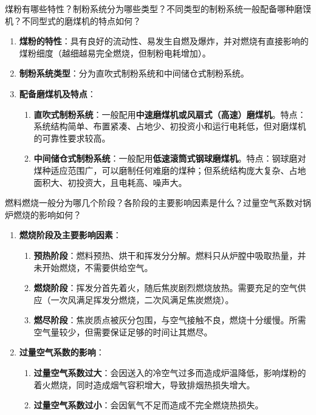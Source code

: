 \begin{problem}
煤粉有哪些特性？制粉系统分为哪些类型？不同类型的制粉系统一般配备哪种磨馍机？不同型式的磨煤机的特点如何？
\end{problem}

\begin{solution}
\begin{enumerate}
  \item \textbf{煤粉的特性}：具有良好的流动性、易发生自燃及爆炸，并对燃烧有直接影响的煤粉细度（越细越易完全燃烧，但制粉电耗增加）。
  \item \textbf{制粉系统类型}：分为直吹式制粉系统和中间储仓式制粉系统。
  \item \textbf{配备磨煤机及特点}：
  \begin{enumerate}
    \item \textbf{直吹式制粉系统}：一般配用\textbf{中速磨煤机或风扇式（高速）磨煤机}。特点：系统结构简单、布置紧凑、占地少、初投资小和运行电耗低，但对磨煤机的可靠性要求较高。
    \item \textbf{中间储仓式制粉系统}：一般配用\textbf{低速滚筒式钢球磨煤机}。特点：钢球磨对煤种适应范围广，可以磨制任何难磨的煤种；但系统结构庞大复杂、占地面积大、初投资大，且电耗高、噪声大。
  \end{enumerate}
\end{enumerate}
\end{solution}

\begin{problem}
燃料燃烧一般分为哪几个阶段？各阶段的主要影响因素是什么？过量空气系数对锅炉燃烧的影响如何？
\end{problem}

\begin{solution}
\begin{enumerate}
  \item \textbf{燃烧阶段及主要影响因素}：
  \begin{enumerate}
    \item \textbf{预热阶段}：燃料预热、烘干和挥发分分解。燃料只从炉膛中吸取热量，并未开始燃烧，不需要供给空气。
    \item \textbf{燃烧阶段}：挥发分首先着火，随后焦炭剧烈燃烧放热。需要充足的空气供应（一次风满足挥发分燃烧，二次风满足焦炭燃烧）。
    \item \textbf{燃尽阶段}：焦炭质点被灰分包围，与空气接触不良，燃烧十分缓慢。所需空气量较少，但需要保证足够的时间让其燃尽。
  \end{enumerate}
  \item \textbf{过量空气系数的影响}：
  \begin{enumerate}
    \item \textbf{过量空气系数过大}：会因送入的冷空气过多而造成炉温降低，影响煤粉的着火燃烧，同时造成烟气容积增大，导致排烟热损失增大。
    \item \textbf{过量空气系数过小}：会因氧气不足而造成不完全燃烧热损失。
  \end{enumerate}
\end{enumerate}
\end{solution}

